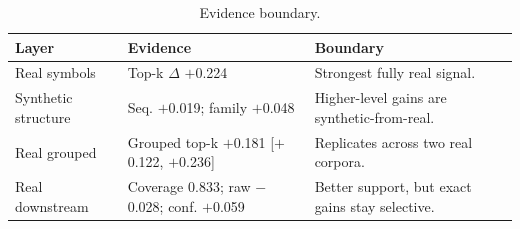 \begin{table}[t]
\caption{Evidence boundary.}
\label{tab:bridge}
\centering
\footnotesize
\setlength{\tabcolsep}{3pt}
\renewcommand{\arraystretch}{1.1}
\begin{tabularx}{\columnwidth}{@{}p{1.35cm}p{2.25cm}X@{}}
\toprule
\textbf{Layer} & \textbf{Evidence} & \textbf{Boundary} \\
\midrule
Real symbols & Top-k $\Delta$ $+$0.224 & Strongest fully real signal. \\
Synthetic structure & Seq. $+$0.019; family $+$0.048 & Higher-level gains are synthetic-from-real. \\
Real grouped & Grouped top-k $+$0.181 [$+$0.122, $+$0.236] & Replicates across two real corpora. \\
Real downstream & Coverage 0.833; raw $-$0.028; conf. $+$0.059 & Better support, but exact gains stay selective. \\
\bottomrule
\end{tabularx}
\end{table}
